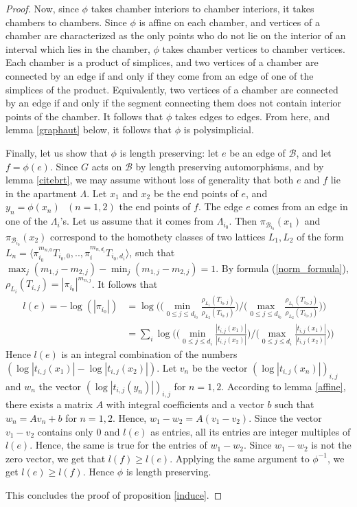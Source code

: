 \documentclass{amsart}
\theoremstyle{theorem}
\theoremstyle{lemma}
\theoremstyle{prop}
\theoremstyle{definition}
\theoremstyle{corollary}
\theoremstyle{remark}
\newcommand{\B}{\mathcal{B}}
\begin{document}
\begin{proof}
Now, since $\phi$ takes chamber interiors to chamber interiors, it takes chambers to chambers. Since $\phi$ is affine on each chamber, and vertices of a chamber are characterized as the only points who do not lie on the interior of an interval which lies in the chamber, $\phi$ takes chamber vertices to chamber vertices. Each chamber is a product of simplices, and two vertices of a chamber are connected by an edge if and only if they come from an edge of one of the simplices of the product. Equivalently, two vertices of a chamber are connected by an edge if and only if the segment connecting them does not contain interior points of the chamber. It follows that $\phi$ takes edges to edges. From here, and lemma \ref{graphaut} below, it follows that $\phi$ is polysimplicial. 

Finally, let us show that $\phi$ is length preserving: let $e$ be an edge of $\B$, and let $f=\phi(e)$. Since $G$ acts on $\B$ by length preserving automorphisms, and by lemma \ref{citebrt}, we may assume without loss of generality that both $e$ and $f$ lie in the apartment $\Lambda$. Let $x_1$ and $x_2$ be the end points of $e$, and $y_n=\phi(x_n) \text{ } (n=1,2)$ the end points of $f$. The edge $e$ comes from an edge in one of the $\Lambda_i$'s. Let us assume that it comes from $\Lambda_{i_0}$. Then $\pi_{\B_{i_0}}(x_1)$ and $\pi_{\B_{i_0}}(x_2)$ correspond to the homothety classes of two lattices $L_1, L_2$ of the form $L_n=\langle \pi_{i_0}^{m_{n,0}}T_{i_0,0}, ..,\pi_i^{m_{n,d_i}}T_{i_0,d_i}\rangle$, such that $\max_j(m_{1,j}-m_{2,j})-\min_j(m_{1,j}-m_{2,j}) = 1$. By formula (\ref{norm_formula}), $\rho_{L_i}(T_{i,j})=|\pi_{i_0}|^{m_{n,j}}$. 
It follows that
\begin{equation*}
\begin{split}
l(e) = - \log(|\pi_{i_0}|)& = \log \Big (\Big(\min_{0 \leq j \leq d_{i_0}} \frac{\rho_{L_1}(T_{i_0,j})}{\rho_{L_2}(T_{i_0,j})} \Big) /  \Big(\max_{0 \leq j \leq d_{i_0}} \frac{\rho_{L_1}(T_{i_0,j})}{\rho_{L_2}(T_{i_0,j})} \Big) \Big )\\
& =\sum_i \log \Big(\Big(\min_{0 \leq j \leq d_i} \frac{|t_{i,j}(x_1)|}{|t_{i,j}(x_2)|}\Big) / \Big (\max_{0 \leq j \leq d_i} \frac{|t_{i,j}(x_1)|}{|t_{i,j}(x_2)|}\Big)\Big) 
\end{split}
\end{equation*}
Hence $l(e)$ is an integral combination of the numbers $(\log |t_{i,j}(x_1)| - \log |t_{i,j}(x_2)|)$. 
Let $v_n$ be the vector $(\log |t_{i,j}(x_n)|)_{i,j}$ and $w_n$ the vector $(\log |t_{i,j}(y_n)|)_{i,j}$ for $n=1,2$.  According to lemma \ref{affine}, there exists a matrix $A$ with integral coefficients and a vector $b$ such that $w_n=Av_n+b$ for $n=1,2$. Hence, $w_1-w_2= A(v_1-v_2)$. Since the vector $v_1-v_2$ contains only $0$ and $l(e)$ as entries, all its entries are integer multiples of $l(e)$. Hence, the same is true for the entries of $w_1-w_2$. Since $w_1-w_2$ is not the zero vector, we get that $l(f)\geq l(e)$. Applying the same argument to $\phi^{-1}$, we get $l(e)\geq l(f)$. Hence $\phi$ is length preserving.

This concludes the proof of proposition \ref{induce}. \end{proof}
\end{document}
